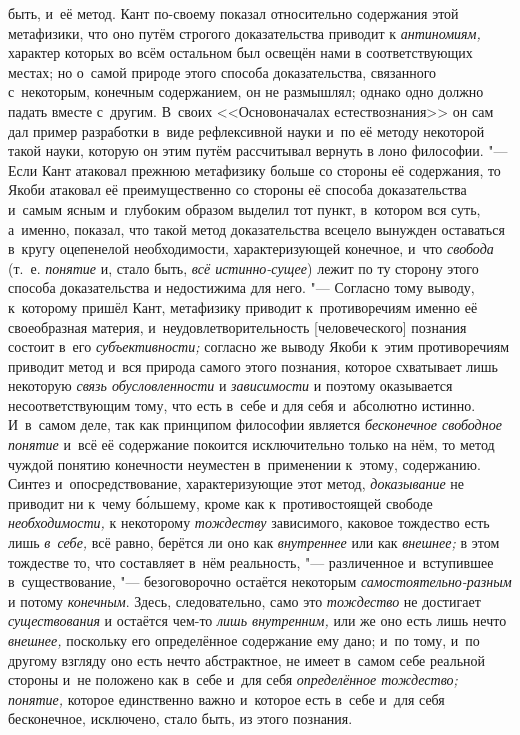 быть, и~её метод. Кант по-своему показал относительно содержания этой
метафизики, что оно путём строгого доказательства приводит к
{\em антиномиям,}
характер которых во всём остальном был освещён нами в
соответствующих местах; но о~самой природе этого способа доказательства,
связанного с~некоторым, конечным содержанием, он не размышлял; однако одно
должно падать вместе с~другим. В~своих <<Основоначалах
естествознания>>
он сам дал пример разработки в~виде рефлексивной науки и~по
её методу некоторой такой науки, которую он этим путём рассчитывал вернуть
в лоно философии. "--- Если Кант атаковал прежнюю метафизику
больше со стороны её содержания, то Якоби атаковал её преимущественно со
стороны её способа доказательства и~самым ясным и~глубоким образом выделил
тот пункт, в~котором вся суть, а~именно, показал, что такой метод
доказательства всецело вынужден оставаться в~кругу оцепенелой
необходимости, характеризующей конечное, и~что {\em свобода}
(т.~е. {\em понятие} и, стало быть, {\em всё истинно-сущее})
лежит по ту сторону этого способа доказательства и
недостижима для него. "--- Согласно тому выводу, к~которому
пришёл Кант, метафизику приводит к~противоречиям именно её своеобразная
материя, и~неудовлетворительность [человеческого] познания состоит в~его
{\em субъективности;} согласно же выводу Якоби к~этим противоречиям приводит
метод и~вся природа самого этого познания, которое схватывает лишь некоторую
{\em связь обусловленности} и {\em зависимости}
и поэтому оказывается несоответствующим тому, что есть в~себе
и для себя и~абсолютно истинно. И~в~самом деле, так как принципом философии
является {\em бесконечное свободное
понятие} и~всё её содержание покоится исключительно только
на нём, то метод чуждой понятию конечности неуместен в~применении к~этому,
содержанию. Синтез и~опосредствование, характеризующие этот метод,
{\em доказывание} не
приводит ни к~чему б\'{о}льшему, кроме как к~противостоящей свободе
{\em необходимости,} к
некоторому {\em тождеству}
зависимого, каковое тождество есть лишь
{\em в~себе,} всё равно,
берётся ли оно как {\em внутреннее}
или как {\em внешнее;}
в этом тождестве то, что составляет в~нём реальность, "---
различенное и~вступившее в~существование, "---
безоговорочно остаётся некоторым
{\em самостоятельно-разным}
и потому {\em конечным}.
Здесь, следовательно, само это
{\em тождество} не
достигает {\em существования}
и остаётся чем-то
{\em лишь внутренним,}
или же оно есть лишь нечто
{\em внешнее,} поскольку
его определённое содержание ему дано; и~по тому, и~по другому взгляду оно
есть нечто абстрактное, не имеет в~самом себе реальной стороны и~не
положено как в~себе и~для себя
{\em определённое тождество;}
{\em понятие,} которое
единственно важно и~которое есть в~себе и~для себя бесконечное, исключено,
стало быть, из этого познания.

